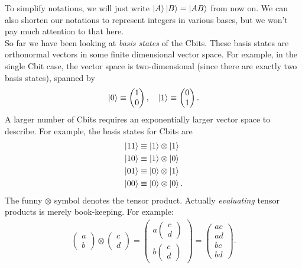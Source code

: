 \documentclass{book}
\theoremstyle{definition}
\newcommand{\nn}{\nonumber}
\begin{document}
To simplify notations, we will just write $\ket{A}\ket{B} = \ket{AB}$ from now on. We can also shorten our notations to represent integers in various bases, but we won't pay much attention to that here. \\

So far we have been looking at \textit{basis states} of the Cbits. These basis states are orthonormal vectors in some finite dimensional vector space. For example, in the single Cbit case, the vector space is two-dimensional (since there are exactly two basis states), spanned by 
\begin{align}
\ket{0} \equiv \begin{pmatrix}
1 \\0
\end{pmatrix},\quad 
\ket{1} \equiv \begin{pmatrix}
0 \\ 1
\end{pmatrix}.
\end{align}
A larger number of Cbits requires an exponentially larger vector space to describe. For example, the basis states for Cbits are 
\begin{align}
\ket{11} &\equiv \ket{1} \otimes \ket{1}\nn\\
\ket{10} &\equiv \ket{1} \otimes \ket{0}\nn\\
\ket{01} &\equiv \ket{0} \otimes \ket{1}\nn\\
\ket{00} &\equiv \ket{0} \otimes \ket{0}\nn.
\end{align}
The funny $\otimes$ symbol denotes the tensor product. Actually \textit{evaluating} tensor products is merely book-keeping. For example:
\begin{align}
\begin{pmatrix}
a\\b
\end{pmatrix}\otimes
\begin{pmatrix}
c\\d
\end{pmatrix}
=
\begin{pmatrix}
a\begin{pmatrix}
c\\d
\end{pmatrix}
\\
b\begin{pmatrix}
c\\d
\end{pmatrix}
\end{pmatrix}
=
\begin{pmatrix}
ac\\ad\\bc\\bd
\end{pmatrix}.
\end{align} 
\end{document}
